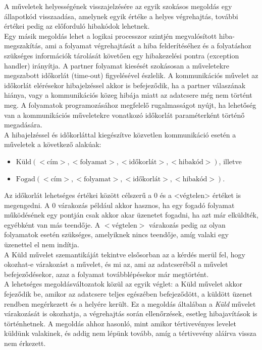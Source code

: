 \documentclass[tikz,12pt,margin=0px]{article}
\begin{document}
    \noindent A műveletek helyességének visszajelzésére az egyik szokásos megoldás egy állapotkód visszaadása, amelynek egyik értéke a helyes végrehajtás, további értékei pedig az előforduló hibakódok lehetnek.\\

    \noindent Egy másik megoldás lehet a logikai processzor szintjén megvalósított hiba-megszakítás, ami a folyamat végrehajtását a hiba felderítéséhez és a folyatáshoz szükséges információk tárolását követően egy hibakezelési pontra (exception handler) irányítja. A partner folyamat kiesését szokásosan a műveletekre megszabott időkorlát (time-out) figyelésével észlelik. A kommunikációs művelet az időkorlát elérésekor hibajelzéssel akkor is befejeződik, ha a partner válaszának hiánya, vagy a kommunikációs közeg hibája miatt az adatcsere még nem történt meg. A folyamatok programozásához megfelelő rugalmasságot nyújt, ha lehetőség van a kommunikációs műveletekre vonatkozó időkorlát paraméterként történő megadására.\\

    \noindent A hibajelzéssel és időkorláttal kiegészítve közvetlen kommunikáció esetén a műveletek a következő alakúak:
    \begin{itemize}[topsep=8pt,itemsep=4pt,partopsep=4pt, parsep=4pt]
        \item $\text{Küld}(<\text{cím}>,<\text{folyamat}>,<\text{időkorlát}>, <\text{hibakód}>)$, illetve
        \item $\text{Fogad}(<\text{cím}>,<\text{folyamat}>,<\text{időkorlát}>,<\text{hibakód}>)$.\\
    \end{itemize}

    \noindent Az időkorlát lehetséges értékei között célszerű a 0 és a <végtelen> értéket is megengedni. A 0 várakozás például akkor hasznos, ha egy fogadó folyamat működésének egy pontján csak akkor akar üzenetet fogadni, ha azt már elküldték, egyébként van más teendője. A $<\text{végtelen}>$ várakozás pedig az olyan folyamatok esetén szükséges, amelyiknek nincs teendője, amíg valaki egy üzenettel el nem indítja.\\

    \noindent A Küld művelet szemantikáját tekintve elsősorban az a kérdés merül fel, hogy okozhat-e várakozást a művelet, és mi az, ami az adatcseréből a művelet befejeződésekor, azaz a folyamat továbblépésekor már megtörtént.\\

    \noindent A lehetséges megoldásváltozatok közül az egyik véglet: a Küld művelet akkor fejeződik be, amikor az adatcsere teljes egészében befejeződött, a küldött üzenet rendben megérkezett és a helyére került. Ez a megoldás általában a \emph{Küld} művelet várakozását is okozhatja, a végrehajtás során ellenőrzések, esetleg hibajavítások is történhetnek. A megoldás ahhoz hasonló, mint amikor tértivevényes levelet küldünk valakinek, és addig nem lépünk tovább, amíg a tértivevény aláírva vissza nem érkezett.\\
\end{document}
